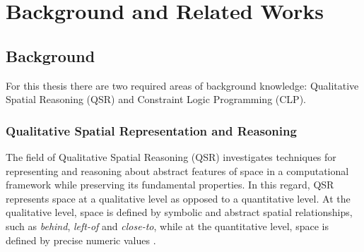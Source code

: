 \documentclass[12pt]{ucthesis}
\begin{document}





\chapter{Background and Related Works} 

\section{Background}
\label{background}
For this thesis there are two required areas of background knowledge: Qualitative Spatial Reasoning (QSR) and Constraint Logic Programming (CLP).

\subsection{Qualitative Spatial Representation and Reasoning}
The field of Qualitative Spatial Reasoning (QSR) investigates techniques for representing and reasoning about abstract features of space in a computational framework while preserving its fundamental properties. In this regard, QSR represents space at a qualitative level as opposed to a quantitative level. At the qualitative level, space is defined by symbolic and abstract spatial relationships, such as \emph{behind}, \emph{left-of} and \emph{close-to}, while at the quantitative level, space is defined by precise numeric values \cite{freksa1991qsr} \cite{bhattSpatialComputing}. 
\end{document}
